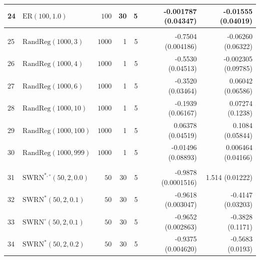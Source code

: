 \documentclass[review]{elsarticle}
\numberwithin{equation}{section}
\begin{document}
\begin{table}
\begin{center}
{\begin{tabular}{l|lrrrrr}
24  & $\mathrm{ER}(100,1.0)$  & $100$ & 30 & 5 & -0.001787 (0.04347) &  -0.01555 (0.04019)\\
\hline\\
25  & $\mathrm{RandReg}(1000,3)$ & $1000$ & 1 & 5  & -0.7504 (0.004186) & -0.06260 (0.06322)\\
26  & $\mathrm{RandReg}(1000,4)$ & $1000$ & 1 & 5  & -0.5530 (0.04513) & -0.002305 (0.09785)\\
27  & $\mathrm{RandReg}(1000,6)$ & $1000$ & 1 & 5  & -0.3520 (0.03464) & 0.06042 (0.06586)\\
28  & $\mathrm{RandReg}(1000,10)$& $1000$ & 1 & 5  & -0.1939 (0.06167) & 0.07274 (0.1238)\\
29  & $\mathrm{RandReg}(1000,100)$ & $1000$ & 1 & 5  & 0.06378 (0.04519) & 0.1084 (0.05844) \\
30  & $\mathrm{RandReg}(1000,999)$ & $1000$ & 1 & 5 & -0.01496 (0.08893) & 0.006464 (0.04166) \\
\hline\\
31  & $\mathrm{SWRN}^{*,\circ}(50,2,0.0)$ & $50$ & 30 & 5 &  -0.9878 (0.0001516) & 1.514 (0.01222) \\
32  & $\mathrm{SWRN}^*(50,2,0.1)$ & $50$ & 30 & 5 &  -0.9618 (0.003047) & -0.4147 (0.03203) \\
33  & $\mathrm{SWRN}^{\circ}(50,2,0.1)$ & $50$ & 30 & 5 &  -0.9652 (0.002863) & -0.3828 (0.1171) \\
34  & $\mathrm{SWRN}^*(50,2,0.2)$ & $50$ & 30 & 5 & -0.9375 (0.004620) & -0.5683 (0.0193) \\

\end{tabular}}
\end{center}
\end{table}
\end{document}
